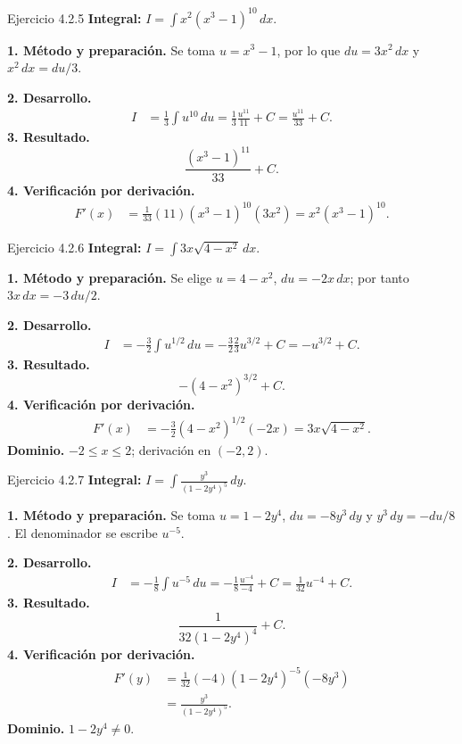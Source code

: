 \begin{examplebox}{Ejercicio 4.2.5}
\textbf{Integral:} $\displaystyle I=\int x^2(x^3-1)^{10}\,dx$.

\textbf{1. Método y preparación.} Se toma $u=x^3-1$, por lo que $du=3x^2\,dx$ y $x^2\,dx=du/3$.

\textbf{2. Desarrollo.}
\begin{align*}
I&=\frac13\int u^{10}\,du=\frac13\frac{u^{11}}{11}+C=\frac{u^{11}}{33}+C.
\end{align*}
\textbf{3. Resultado.}
\[
\frac{(x^3-1)^{11}}{33}+C.
\]
\textbf{4. Verificación por derivación.}
\begin{align*}
F'(x)&=\frac1{33}(11)(x^3-1)^{10}(3x^2)=x^2(x^3-1)^{10}.
\end{align*}
\end{examplebox}

\begin{examplebox}{Ejercicio 4.2.6}
\textbf{Integral:} $\displaystyle I=\int 3x\sqrt{4-x^2}\,dx$.

\textbf{1. Método y preparación.} Se elige $u=4-x^2$, $du=-2x\,dx$; por tanto $3x\,dx=-3\,du/2$.

\textbf{2. Desarrollo.}
\begin{align*}
I&=-\frac32\int u^{1/2}\,du=-\frac32\frac23u^{3/2}+C=-u^{3/2}+C.
\end{align*}
\textbf{3. Resultado.}
\[
-(4-x^2)^{3/2}+C.
\]
\textbf{4. Verificación por derivación.}
\begin{align*}
F'(x)&=-\frac32(4-x^2)^{1/2}(-2x)=3x\sqrt{4-x^2}.
\end{align*}
\textbf{Dominio.} $-2\le x\le2$; derivación en $(-2,2)$.
\end{examplebox}

\begin{examplebox}{Ejercicio 4.2.7}
\textbf{Integral:} $\displaystyle I=\int \frac{y^3}{(1-2y^4)^5}\,dy$.

\textbf{1. Método y preparación.} Se toma $u=1-2y^4$, $du=-8y^3\,dy$ y $y^3\,dy=-du/8$. El denominador se escribe $u^{-5}$.

\textbf{2. Desarrollo.}
\begin{align*}
I&=-\frac18\int u^{-5}\,du=-\frac18\frac{u^{-4}}{-4}+C=\frac1{32}u^{-4}+C.
\end{align*}
\textbf{3. Resultado.}
\[
\frac1{32(1-2y^4)^4}+C.
\]
\textbf{4. Verificación por derivación.}
\begin{align*}
F'(y)&=\frac1{32}(-4)(1-2y^4)^{-5}(-8y^3)\\&=\frac{y^3}{(1-2y^4)^5}.
\end{align*}
\textbf{Dominio.} $1-2y^4\ne0$.
\end{examplebox}

